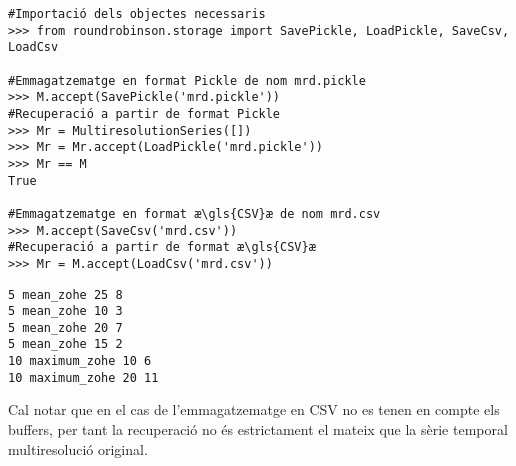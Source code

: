 \begin{lstlisting}[style=py,caption=Operacions complementàries de RoundRobinson per a l'emmagatzematge,label=lst:roundrobinson:storage]
#Importació dels objectes necessaris
>>> from roundrobinson.storage import SavePickle, LoadPickle, SaveCsv, LoadCsv

#Emmagatzematge en format Pickle de nom mrd.pickle
>>> M.accept(SavePickle('mrd.pickle'))
#Recuperació a partir de format Pickle
>>> Mr = MultiresolutionSeries([])
>>> Mr = Mr.accept(LoadPickle('mrd.pickle'))
>>> Mr == M
True

#Emmagatzematge en format æ\gls{CSV}æ de nom mrd.csv
>>> M.accept(SaveCsv('mrd.csv'))
#Recuperació a partir de format æ\gls{CSV}æ
>>> Mr = M.accept(LoadCsv('mrd.csv'))
\end{lstlisting}


\begin{lstlisting}[style=file,caption=Dades del fitxer mrd.csv,label=lst:roundrobinson:csv]
5 mean_zohe 25 8
5 mean_zohe 10 3
5 mean_zohe 20 7
5 mean_zohe 15 2
10 maximum_zohe 10 6
10 maximum_zohe 20 11
\end{lstlisting}


Cal notar que en el cas de l'emmagatzematge en \gls{CSV} no es tenen
en compte els buffers, per tant la recuperació no és estrictament el
mateix que la sèrie temporal multiresolució original.







    
    
    




